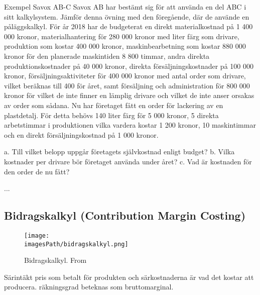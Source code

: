 \begin{exampleblock}{Exempel Savox AB-C}
    Savox AB har bestämt sig för att använda en del ABC i sitt kalkylsystem. Jämför 
    denna övning med den föregående, där de använde en påläggskalkyl. För år 2018 har de 
    budgeterat en direkt materialkostnad på 1 400 000 kronor, materialhantering för 280 000 
    kronor med liter färg som drivare, produktion som kostar 400 000 kronor, maskinbearbetning 
    som kostar 880 000 kronor för den planerade maskintiden 8 800 timmar, andra direkta 
    produktionskostnader på 40 000 kronor, direkta försäljningskostnader på 100 000 kronor, 
    försäljningsaktiviteter för 400 000 kronor med antal order som drivare, vilket beräknas till 400 för 
    året, samt försäljning och administration för 800 000 kronor för vilket de inte finner en lämplig 
    drivare och vilket de inte anser orsakas av order som sådana. Nu har företaget fått en order för 
    lackering av en plastdetalj. För detta behövs 140 liter färg för 5 000 kronor, 5 direkta arbetstimmar i 
    produktionen vilka vardera kostar 1 200 kronor, 10 maskintimmar och en direkt försäljningskostnad 
    på 1 000 kronor.

    a. Till vilket belopp uppgår företagets självkostnad enligt budget?
    b. Vilka kostnader per drivare bör företaget använda under året? 
    c. Vad är kostnaden för den order de nu fått? 

   ... %
\end{exampleblock}
%


\newpage
\subsection{Bidragskalkyl (Contribution Margin Costing)}
\begin{figure}[H]
    \centering
    \texttt{[image: \\imagesPath/bidragskalkyl.png]}
    \caption{Bidragskalkyl. From \cite{im}}
\end{figure}
Särintäkt pris som betalt för produkten och särkostnaderna är vad det kostar att producera.
räkningsgrad beteknas som bruttomarginal.

